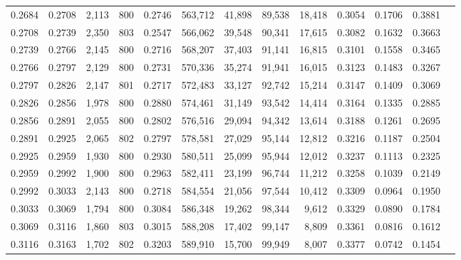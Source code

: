 \begin{tabular}{rrrrrrrrrrrrr}
0.2684 & 0.2708 &  2,113 & 800 &                                     0.2746 & 563,712 &  41,898 &  89,538 &  18,418 & 0.3054 & 0.1706 & 0.3881 \\
0.2708 & 0.2739 &  2,350 & 803 &                                     0.2547 & 566,062 &  39,548 &  90,341 &  17,615 & 0.3082 & 0.1632 & 0.3663 \\
0.2739 & 0.2766 &  2,145 & 800 &                                     0.2716 & 568,207 &  37,403 &  91,141 &  16,815 & 0.3101 & 0.1558 & 0.3465 \\
0.2766 & 0.2797 &  2,129 & 800 &                                     0.2731 & 570,336 &  35,274 &  91,941 &  16,015 & 0.3123 & 0.1483 & 0.3267 \\
0.2797 & 0.2826 &  2,147 & 801 &                                     0.2717 & 572,483 &  33,127 &  92,742 &  15,214 & 0.3147 & 0.1409 & 0.3069 \\
0.2826 & 0.2856 &  1,978 & 800 &                                     0.2880 & 574,461 &  31,149 &  93,542 &  14,414 & 0.3164 & 0.1335 & 0.2885 \\
0.2856 & 0.2891 &  2,055 & 800 &                                     0.2802 & 576,516 &  29,094 &  94,342 &  13,614 & 0.3188 & 0.1261 & 0.2695 \\
0.2891 & 0.2925 &  2,065 & 802 &                                     0.2797 & 578,581 &  27,029 &  95,144 &  12,812 & 0.3216 & 0.1187 & 0.2504 \\
0.2925 & 0.2959 &  1,930 & 800 &                                     0.2930 & 580,511 &  25,099 &  95,944 &  12,012 & 0.3237 & 0.1113 & 0.2325 \\
0.2959 & 0.2992 &  1,900 & 800 &                                     0.2963 & 582,411 &  23,199 &  96,744 &  11,212 & 0.3258 & 0.1039 & 0.2149 \\
0.2992 & 0.3033 &  2,143 & 800 &                                     0.2718 & 584,554 &  21,056 &  97,544 &  10,412 & 0.3309 & 0.0964 & 0.1950 \\
0.3033 & 0.3069 &  1,794 & 800 &                                     0.3084 & 586,348 &  19,262 &  98,344 &   9,612 & 0.3329 & 0.0890 & 0.1784 \\
0.3069 & 0.3116 &  1,860 & 803 &                                     0.3015 & 588,208 &  17,402 &  99,147 &   8,809 & 0.3361 & 0.0816 & 0.1612 \\
0.3116 & 0.3163 &  1,702 & 802 &                                     0.3203 & 589,910 &  15,700 &  99,949 &   8,007 & 0.3377 & 0.0742 & 0.1454 \\

\end{tabular}
